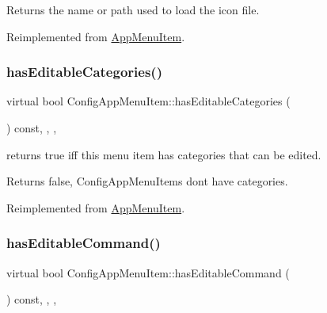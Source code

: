 \begin{DoxyReturn}{Returns}
the name or path used to load the icon file. 
\end{DoxyReturn}


Reimplemented from \mbox{\hyperlink{classAppMenuItem_a7c5b3d84b4fa24009e0618e0e3cd804e}{App\+Menu\+Item}}.

\mbox{\label{classConfigAppMenuItem_a3fc7d1bbbe4b75e522f77d4efc688819}} 
\subsubsection{\texorpdfstring{has\+Editable\+Categories()}{hasEditableCategories()}}
{\footnotesize\ttfamily virtual bool Config\+App\+Menu\+Item\+::has\+Editable\+Categories (\begin{DoxyParamCaption}{ }\end{DoxyParamCaption}) const\hspace{0.3cm}{\ttfamily [inline]}, {\ttfamily [override]}, {\ttfamily [protected]}, {\ttfamily [virtual]}}

returns true iff this menu item has categories that can be edited. \begin{DoxyReturn}{Returns}
false, Config\+App\+Menu\+Items don\textquotesingle{}t have categories. 
\end{DoxyReturn}


Reimplemented from \mbox{\hyperlink{classAppMenuItem_aa9656d7c1a2dd93bd02f119c0efbb2e0}{App\+Menu\+Item}}.

\mbox{\label{classConfigAppMenuItem_a7c7b432e4c9e7aaf09f00c47b7f165d7}} 
\subsubsection{\texorpdfstring{has\+Editable\+Command()}{hasEditableCommand()}}
{\footnotesize\ttfamily virtual bool Config\+App\+Menu\+Item\+::has\+Editable\+Command (\begin{DoxyParamCaption}{ }\end{DoxyParamCaption}) const\hspace{0.3cm}{\ttfamily [inline]}, {\ttfamily [override]}, {\ttfamily [protected]}, {\ttfamily [virtual]}}

